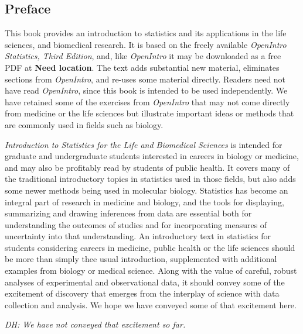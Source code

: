 \begin{doublespace}

\chapter*{Preface}



This book provides an introduction to statistics and its applications in the life sciences, and biomedical research.  It is based on the freely available \textsl{OpenIntro Statistics, Third Edition}, and, like \textsl{OpenIntro} it may be downloaded as a free PDF at \textbf{Need location}.  The text adds substantial new material, eliminates sections from \textsl{OpenIntro}, and re-uses some material directly.  Readers need not have read \textsl{OpenIntro}, since this book is intended to be used independently.  We have retained some of the exercises from \textsl{OpenIntro} that may not come directly from medicine or the life sciences but illustrate important ideas or methods that are commonly used in fields such as biology.

\textsl{Introduction to Statistics for the Life and Biomedical Sciences} is intended for graduate and undergraduate students interested in careers in biology or medicine, and may also be profitably read by students of public health.  It covers many of the traditional introductory topics in statistics used in those fields, but also adds some newer methods being used in molecular biology.  Statistics has become an integral part of research in medicine and biology, and the tools for displaying, summarizing and drawing inferences from data are essential both for understanding the outcomes of studies and for incorporating measures of uncertainty into that understanding.  An introductory text in statistics for students considering careers in medicine, public health or the life sciences should be more than simply thee usual introduction, supplemented with additional examples from biology or medical science. Along with the value of careful, robust analyses of experimental and observational data, it should convey some of the excitement of discovery that emerges from the interplay of science with data collection and analysis.  We hope we have conveyed some of that excitement here. 

\textit{DH: We have not conveyed that excitement so far.}


\end{doublespace}
